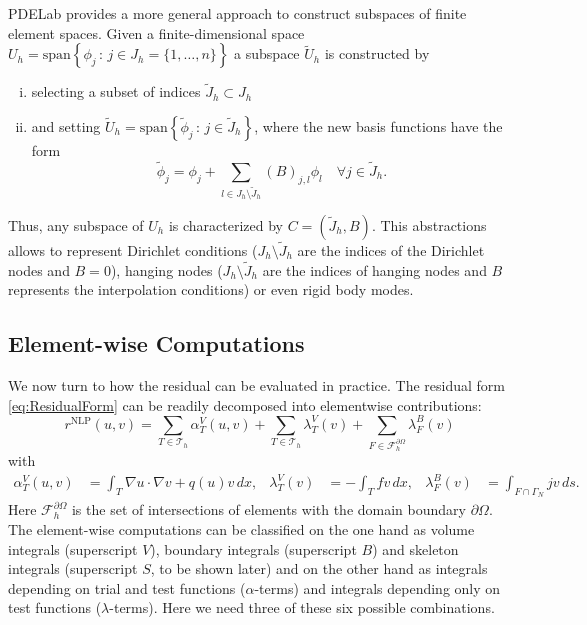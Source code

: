 \documentclass[a4paper,12pt]{article}
\begin{document}
PDELab provides a more general approach to construct subspaces of
finite element spaces. Given a
finite-dimensional space $U_h = \text{span}\left\{\phi_j \,:\, j\in J_h=\{1,\ldots,n\}\right\}$
a subspace $\tilde{U}_h$ is constructed by 
\begin{enumerate}[i)]
\item selecting a subset of indices $\tilde{J}_h\subset J_h$
\item and setting $\tilde{U}_h = \text{span}\left\{\tilde\phi_j \,:\, j\in \tilde{J}_h\right\}$,
where the new basis functions have the form 
\begin{equation*}
\tilde\phi_j = \phi_j + \sum_{l\in J_h\setminus\tilde{J}_h} (B)_{j,l} \phi_l \quad \forall j\in \tilde{J}_h.
\end{equation*}
\end{enumerate}
Thus, any subspace of $U_h$ is characterized by $C=(\tilde{J}_h,B)$.
This abstractions allows to represent Dirichlet conditions ($J_h\setminus\tilde{J}_h$
are the indices of the Dirichlet nodes and $B=0$), hanging nodes
($J_h\setminus\tilde{J}_h$ are the indices of hanging nodes and $B$ represents
the interpolation conditions) or even rigid body modes.


\subsection{Element-wise Computations}
\label{Sec:ElementComputations}

We now turn to how the residual can be evaluated in practice.
The residual form \eqref{eq:ResidualForm} can be readily decomposed into
elementwise contributions:
\begin{equation*}
r^{\text{NLP}}\left(u,v\right) =  
\sum_{T\in\mathcal{T}_h} \alpha_T^V(u,v) 
  + \sum_{T\in\mathcal{T}_h} \lambda_T^V(v)
 + \sum_{F\in\mathcal{F}_h^{\partial\Omega}}\lambda_F^B(v)
\end{equation*}
with
\begin{align*}
\alpha_T^V(u,v) &= \int_T \nabla u \cdot \nabla v + q(u) v \,dx, &
\lambda_T^V(v) &= - \int_T f v \,dx, &
\lambda_F^B(v) &= \int_{F\cap\Gamma_N} j v\,ds.
\end{align*}
Here $\mathcal{F}_h^{\partial\Omega}$ is the set of intersections of
elements with the domain boundary $\partial\Omega$.
The element-wise computations can be classified on the one hand as volume
integrals (superscript $V$), boundary integrals (superscript $B$) and
skeleton integrals (superscript $S$, to be shown later) and on the
other hand as integrals depending on trial and test functions ($\alpha$-terms)
and integrals depending only on test functions ($\lambda$-terms). Here we need
three of these six possible combinations.
\end{document}
